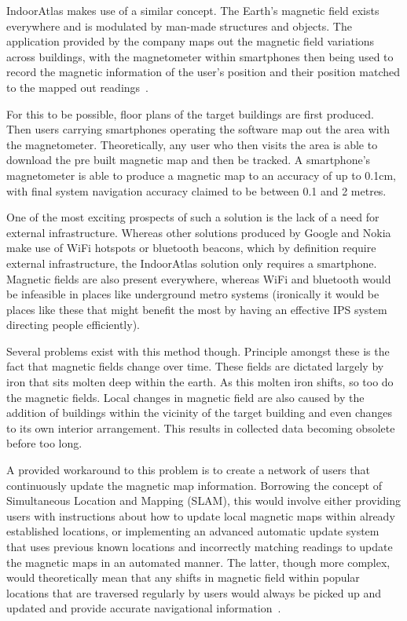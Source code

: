 \documentclass[12pt,a4paper]{report}
\begin{document}
IndoorAtlas makes use of a similar concept. The Earth's magnetic field exists everywhere and is modulated by man-made structures and objects. The application provided by the company maps out the magnetic field variations across buildings, with the magnetometer within smartphones then being used to record the magnetic information of the user's position and their position matched to the mapped out readings~\cite{IAReport}.
 
For this to be possible, floor plans of the target buildings are first produced. Then users carrying smartphones operating the software map out the area with the magnetometer. Theoretically, any user who then visits the area is able to download the pre built magnetic map and then be tracked. A smartphone's magnetometer is able to produce a magnetic map to an accuracy of up to 0.1cm, with final system navigation accuracy claimed to be between 0.1 and 2 metres. 
 
One of the most exciting prospects of such a solution is the lack of a need for external infrastructure. Whereas other solutions produced by Google and Nokia make use of WiFi hotspots or bluetooth beacons, which by definition require external infrastructure, the IndoorAtlas solution only requires a smartphone. Magnetic fields are also present everywhere, whereas WiFi and bluetooth would be infeasible in places like underground metro systems (ironically it would be places like these that might benefit the most by having an effective IPS system directing people efficiently).
 
Several problems exist with this method though. Principle amongst these is the fact that magnetic fields change over time. These fields are dictated largely by iron that sits molten deep within the earth. As this molten iron shifts, so too do the magnetic fields. Local changes in magnetic field are also caused by the addition of buildings within the vicinity of the target building and even changes to its own interior arrangement. This results in collected data becoming obsolete before too long.
 
 A provided workaround to this problem is to create a network of users that continuously update the magnetic map information. Borrowing the concept of Simultaneous Location and Mapping (SLAM), this would involve either providing users with instructions about how to update local magnetic maps within already established locations, or implementing an advanced automatic update system that uses previous known locations and incorrectly matching readings to update the magnetic maps in an automated manner. The latter, though more complex, would theoretically mean that any shifts in magnetic field within popular locations that are traversed regularly by users would always be picked up and updated and provide accurate navigational information~\cite{IAReport}.
 
\end{document}
